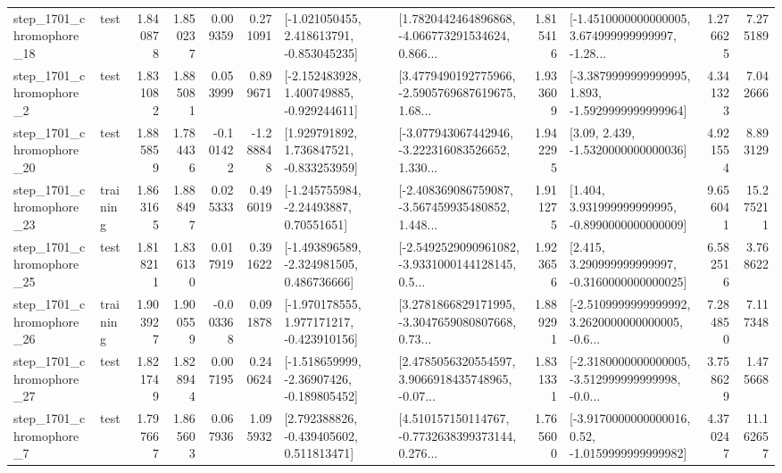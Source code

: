 \begin{tabular}{llrrrrllrlrr}
 step\_1701\_chromophore\_18 &      test &      1.840878 &    1.850237 &      0.009359 &  0.271091 &   [-1.021050455, 2.418613791, -0.853045235] &  [1.7820442464896868, -4.066773291534624, 0.866... &       1.815416 &  [-1.4510000000000005, 3.674999999999997, -1.28... &            1.276625 &          7.275189 \\
  step\_1701\_chromophore\_2 &      test &      1.831082 &    1.885081 &      0.053999 &  0.899671 &   [-2.152483928, 1.400749885, -0.929244611] &  [3.4779490192775966, -2.5905769687619675, 1.68... &       1.933609 &  [-3.3879999999999995, 1.893, -1.5929999999999964] &            4.341323 &          7.042666 \\
 step\_1701\_chromophore\_20 &      test &      1.885859 &    1.784436 &     -0.101422 & -1.288848 &    [1.929791892, 1.736847521, -0.833253959] &  [-3.077943067442946, -3.222316083526652, 1.330... &       1.942295 &                 [3.09, 2.439, -1.5320000000000036] &            4.921554 &          8.893129 \\
 step\_1701\_chromophore\_23 &  training &      1.863165 &    1.888497 &      0.025333 &  0.496019 &     [-1.245755984, -2.24493887, 0.70551651] &  [-2.408369086759087, -3.567459935480852, 1.448... &       1.911275 &    [1.404, 3.931999999999995, -0.8990000000000009] &            9.656041 &         15.275211 \\
 step\_1701\_chromophore\_25 &      test &      1.818211 &    1.836130 &      0.017919 &  0.391622 &   [-1.493896589, -2.324981505, 0.486736666] &  [-2.5492529090961082, -3.9331000144128145, 0.5... &       1.923656 &    [2.415, 3.290999999999997, -0.3160000000000025] &            6.582516 &          3.768622 \\
 step\_1701\_chromophore\_26 &  training &      1.903927 &    1.900559 &     -0.003368 &  0.091878 &   [-1.970178555, 1.977171217, -0.423910156] &  [3.2781866829171995, -3.3047659080807668, 0.73... &       1.889291 &  [-2.5109999999999992, 3.2620000000000005, -0.6... &            7.284850 &          7.117348 \\
 step\_1701\_chromophore\_27 &      test &      1.821749 &    1.828944 &      0.007195 &  0.240624 &   [-1.518659999, -2.36907426, -0.189805452] &  [2.4785056320554597, 3.9066918435748965, -0.07... &       1.831331 &  [-2.3180000000000005, -3.512999999999998, -0.0... &            3.758629 &          1.475668 \\
  step\_1701\_chromophore\_7 &      test &      1.797667 &    1.865603 &      0.067936 &  1.095932 &    [2.792388826, -0.439405602, 0.511813471] &  [4.510157150114767, -0.7732638399373144, 0.276... &       1.765600 &   [-3.9170000000000016, 0.52, -1.0159999999999982] &            4.370247 &         11.162657 \\

\end{tabular}
